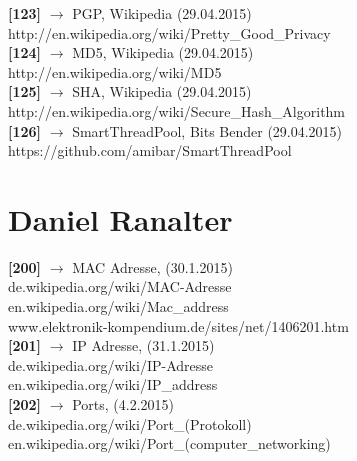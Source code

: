 \documentclass[12pt,a4paper]{report}
\begin{document}
\begin{onehalfspace}
\noindent
\textbf{[123]} $\rightarrow$ PGP, Wikipedia (29.04.2015)\\
http://en.wikipedia.org/wiki/Pretty\_Good\_Privacy\\

\noindent
\textbf{[124]} $\rightarrow$ MD5, Wikipedia (29.04.2015)\\
http://en.wikipedia.org/wiki/MD5\\

\noindent
\textbf{[125]} $\rightarrow$ SHA, Wikipedia (29.04.2015)\\
http://en.wikipedia.org/wiki/Secure\_Hash\_Algorithm\\

\noindent
\textbf{[126]} $\rightarrow$ SmartThreadPool, Bits Bender (29.04.2015)\\
https://github.com/amibar/SmartThreadPool\\

\chapter{Daniel Ranalter}

\noindent
\textbf{[200]} $\rightarrow$  MAC Adresse, (30.1.2015)\\
de.wikipedia.org/wiki/MAC-Adresse\\
en.wikipedia.org/wiki/Mac\_address\\
www.elektronik-kompendium.de/sites/net/1406201.htm\\

\noindent
\textbf{[201]} $\rightarrow$  IP Adresse, (31.1.2015)\\
de.wikipedia.org/wiki/IP-Adresse\\
en.wikipedia.org/wiki/IP\_address\\

\noindent
\textbf{[202]} $\rightarrow$  Ports, (4.2.2015)\\
de.wikipedia.org/wiki/Port\_(Protokoll)\\
en.wikipedia.org/wiki/Port\_(computer\_networking)\\


\end{onehalfspace}
\end{document}
